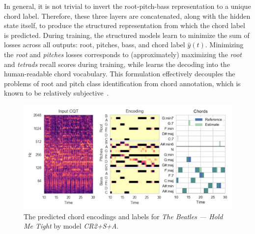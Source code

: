 \documentclass{article}
\begin{document}
In general, it is not trivial to invert the root-pitch-bass representation to a unique chord label.
Therefore, these three layers are concatenated, along with the hidden state itself, to produce the structured representation from which the chord label is predicted.
During training, the structured models learn to minimize the sum of losses across all outputs: root, pitches, bass, and chord label $\hat{y}(t)$.
Minimizing the \emph{root} and \emph{pitches} losses corresponds to (approximately) maximizing the \emph{root} and \emph{tetrads} recall scores during training, while  learns the decoding into the human-readable chord vocabulary.
This formulation effectively decouples the problems of root and pitch class identification from chord annotation, which is known to be relatively subjective~\cite{humphrey2015four}.
\begin{figure}[t]
    \centering
    \includegraphics[width=\columnwidth]{encviz}
    \caption{The predicted chord encodings and labels for \emph{The Beatles --- Hold Me Tight} by model \emph{CR2+S+A}.\label{fig:encviz}}
\end{figure}

\end{document}
